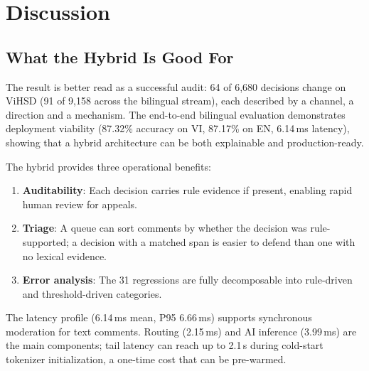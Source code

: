 \section{Discussion}
\label{sec:discussion}

\subsection{What the Hybrid Is Good For}
The result is better read as a successful audit: 64 of 6{,}680 decisions change
on ViHSD (91 of 9{,}158 across the bilingual stream), each described by a channel,
a direction and a mechanism.  The end-to-end bilingual evaluation demonstrates
deployment viability (87.32\% accuracy on VI, 87.17\% on EN, 6.14\,ms latency),
showing that a hybrid architecture can be both explainable and production-ready.

The hybrid provides three operational benefits:
\begin{enumerate}
    \item \textbf{Auditability}: Each decision carries rule evidence if present,
          enabling rapid human review for appeals.
    \item \textbf{Triage}: A queue can sort comments by whether the decision was
          rule-supported; a \hate{} decision with a matched span is easier to
          defend than one with no lexical evidence.
    \item \textbf{Error analysis}: The 31 regressions are fully decomposable into
          rule-driven and threshold-driven categories.
\end{enumerate}

The latency profile (6.14\,ms mean, P95 6.66\,ms) supports synchronous
moderation for text comments.  Routing (2.15\,ms) and AI inference (3.99\,ms) are
the main components; tail latency can reach up to 2.1\,s during cold-start
tokenizer initialization, a one-time cost that can be pre-warmed.